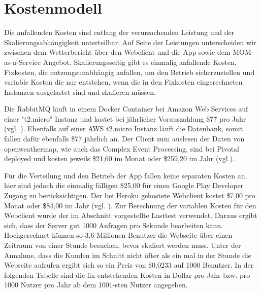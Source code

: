 \section{Kostenmodell}
Die anfallenden Kosten sind entlang der verursachenden Leistung und der Skalierungsabhängigkeit unterteilbar. Auf Seite der Leistungen unterscheiden wir zwischen dem Wetterbericht über den Webclient und die App sowie dem MOM-as-a-Service Angebot. Skalierungsseitig gibt es einmalig anfallende Kosten, Fixkosten, die nutzungsunabhängig anfallen, um den Betrieb sicherzustellen und variable Kosten die nur entstehen, wenn die in den Fixkosten eingerechneten Instanzen ausgelastet sind und skalieren müssen.

Die RabbitMQ läuft in einem Docker Container bei Amazon Web Services auf einer "t2.micro" Instanz und kostet bei jährlicher Vorauszahlung \$77 pro Jahr (vgl. \cite{kos:1}). Ebenfalls auf einer AWS t2.micro Instanz läuft die Datenbank, somit fallen dafür ebenfalls \$77 jährlich an. Der Client zum auslesen der Daten von openweathermap, wie auch das Complex Event Processing, sind bei Pivotal deployed und kosten jeweils \$21,60 im Monat oder \$259,20 im Jahr (vgl.\cite{kos:2}). 


Für die Verteilung und den Betrieb der App fallen keine separaten Kosten an, hier sind jedoch die einmalig fälligen \$25,00 für einen Google Play Developer Zugang zu berücksichtigen. Der bei Heroku gehostete Webclient kostet \$7,00 pro Monat oder \$84,00 im Jahr (vgl. \cite{kos:3}). Zur Berechnung der variablen Kosten für den Webclient wurde der im Abschnitt  vorgestellte Lasttest verwendet. Daraus ergibt sich, dass der Server gut 1000 Anfragen pro Sekunde bearbeiten kann. Hochgerechnet können so 3,6 Millionen Benutzer die Webseite über einen Zeitraum von einer Stunde besuchen, bevor skaliert werden muss. Unter der Annahme, dass die Kunden im Schnitt nicht öfter als ein mal in der Stunde die Webseite aufrufen ergibt sich so ein Preis von \$0,0233 auf 1000 Benutzer. In der folgenden Tabelle sind die fix entstehenden Kosten in Dollar pro Jahr bzw. pro 1000 Nutzer pro Jahr ab dem 1001-sten Nutzer angegeben.


